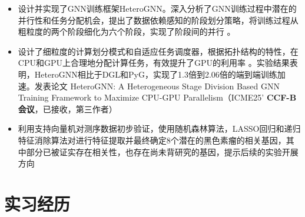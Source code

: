 \documentclass{resume} %
\begin{document}
\begin{itemize} [parsep=0.5ex]
  \item 设计并实现了GNN训练框架HeteroGNN。深入分析了GNN训练过程中潜在的并行性和任务分配机会，提出了数据依赖感知的阶段划分策略，将训练过程从粗粒度的两个阶段细化为六个阶段，实现了阶段间的并行 。
  \item 设计了细粒度的计算划分模式和自适应任务调度器，根据拓扑结构的特性，在CPU和GPU上合理地分配计算任务，有效提升了GPU的利用率 。实验结果表明，HeteroGNN相比于DGL和PyG，实现了1.3倍到2.06倍的端到端训练加速。发表论文 HeteroGNN: A Heterogeneous Stage Division Based GNN Training Framework to Maximize CPU-GPU Parallelism（ICME25' \textbf{CCF-B会议}，已接收，第三作者）
\end{itemize}

\begin{itemize} [parsep=0.5ex]
\item 利用支持向量机对测序数据初步验证，使用随机森林算法，LASSO回归和递归特征消除算法对进行特征提取并最终确定8个潜在的黑色素瘤的相关基因，其中部分已被证实存在相关性，也存在尚未背研究的基因，提示后续的实验开展方向
\end{itemize}


\section{实习经历}
\end{document}
